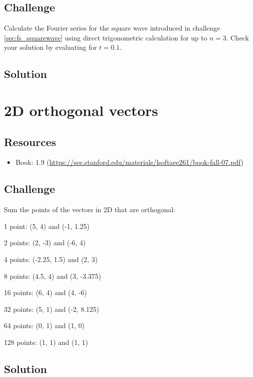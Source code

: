 \subsection*{Challenge}
Calculate the Fourier series for the square wave introduced in challenge \ref{sec:fs_squarewave} using direct trigonometric calculation for up to $n=3$. Check your solution by evaluating for $t=0.1$.

\subsection*{Solution}
\six{}


\timebox




\newpage
\section{2D orthogonal vectors}

\subsection*{Resources}
\begin{itemize}
    \item Book: 1.9 (\url{https://see.stanford.edu/materials/lsoftaee261/book-fall-07.pdf})
\end{itemize}

\subsection*{Challenge}
Sum the points of the vectors in 2D that are orthogonal:

1 point: (5, 4) and (-1, 1.25)

2 points:  (2, -3) and (-6, 4)

4 points: (-2.25, 1.5) and (2, 3)

8 points: (4.5, 4) and (3, -3.375)

16 points: (6, 4) and (4, -6)

32 points: (5, 1) and (-2, 8.125)

64 points: (0, 1) and (1, 0)

128 points: (1, 1) and (1, 1)

\subsection*{Solution}
\six{}

